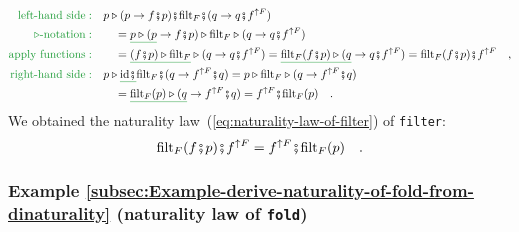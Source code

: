 \begin{align*}
{\color{greenunder}\text{left-hand side}:}\quad & p\triangleright(p\rightarrow f\bef p)\bef\text{filt}_{F}\bef(q\rightarrow q\bef f^{\uparrow F})\\
{\color{greenunder}\triangleright\text{-notation}:}\quad & \quad=\gunderline{p\triangleright(p}\rightarrow f\bef p)\triangleright\text{filt}_{F}\triangleright(q\rightarrow q\bef f^{\uparrow F})\\
{\color{greenunder}\text{apply functions}:}\quad & \quad=\gunderline{(f\bef p)\triangleright\text{filt}_{F}}\triangleright(q\rightarrow q\bef f^{\uparrow F})=\gunderline{\text{filt}_{F}(f\bef p)\triangleright(q}\rightarrow q\bef f^{\uparrow F})=\text{filt}_{F}(f\bef p)\bef f^{\uparrow F}\quad,\\
{\color{greenunder}\text{right-hand side}:}\quad & p\triangleright\gunderline{\text{id}\bef}\text{filt}_{F}\bef(q\rightarrow f^{\uparrow F}\bef q)=p\triangleright\text{filt}_{F}\triangleright(q\rightarrow f^{\uparrow F}\bef q)\\
 & \quad=\gunderline{\text{filt}_{F}(p)\triangleright(q}\rightarrow f^{\uparrow F}\bef q)=f^{\uparrow F}\bef\text{filt}_{F}(p)\quad.
\end{align*}
We obtained the naturality law~(\ref{eq:naturality-law-of-filter})
of \lstinline!filter!:
\[
\text{filt}_{F}(f\bef p)\bef f^{\uparrow F}=f^{\uparrow F}\bef\text{filt}_{F}(p)\quad.
\]


\subsubsection{Example \label{subsec:Example-derive-naturality-of-fold-from-dinaturality}\ref{subsec:Example-derive-naturality-of-fold-from-dinaturality}
(naturality law of \lstinline!fold!)}


